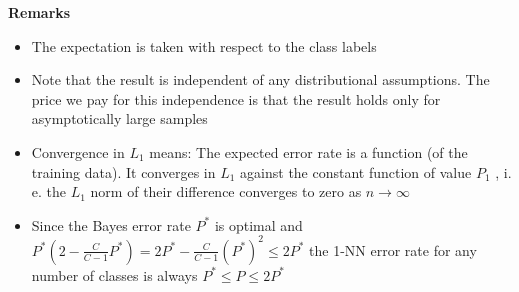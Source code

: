 \documentclass[main]{subfiles}
\begin{document}
\textbf{Remarks}
\begin{itemize}
\item The expectation is taken with respect to the class labels
\item Note that the result is independent of any distributional
assumptions. The price we pay for this independence is that the
result holds only for asymptotically large samples
\item Convergence in $L_1$ means: The expected error rate is a function
(of the training data). It converges in $L_1$ against the constant
function of value $P_1$ , i. e. the $L_1$ norm of their difference
converges to zero as $n \to \infty$
\item Since the Bayes error rate $P^*$ is optimal and $P^* \left( 2- \frac{C}{C-1} P^* \right ) = 2P^* - \frac{C}{C-1} (P^*)^2 \le 2P^*$ the 1-NN error rate for any number of classes is always $P^* \le P \le 2P^*$

\end{itemize}
\end{document}
